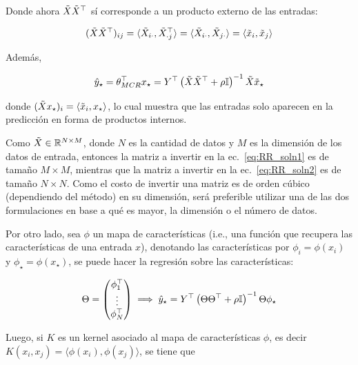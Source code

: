 Donde ahora $\tilde{X}\tilde{X}^\top$ sí corresponde a un producto externo de las entradas:

\begin{equation}
	(\tilde{X}\tilde{X}^\top)_{ij}=\langle\tilde{X}_{i\cdot},\tilde{X}^\top_{\cdot j}\rangle=\langle\tilde{X}_{i\cdot},\tilde{X}_{j\cdot}\rangle = \langle \tilde{x}_i,\tilde{x}_j\rangle
\end{equation}

Además,

\begin{equation}
	\hat{y}_\star = \theta_{MCR}^\top x_\star = Y^\top \left(\tilde{X}\tilde{X}^\top + \rho{\mathbb I}\right)^{-1}\tilde{X} \tilde{x}_\star
\end{equation}

donde $(\tilde{X} x_\star)_i = \langle \tilde{x}_i,x_\star\rangle$, lo cual muestra que las entradas solo aparecen en la predicción en forma de productos internos.

\begin{remark}
Como $\tilde{X}\in\mathbb{R}^{N\times M}$, donde $N$ es la cantidad de datos y $M$ es la dimensión de los datos de entrada, entonces la matriz a invertir en la ec.~\eqref{eq:RR_soln1} es de tamaño $M\times M$, mientras que la matriz a invertir en la ec.~\eqref{eq:RR_soln2} es de tamaño $N\times N$. Como el costo de invertir una matriz es de orden cúbico (dependiendo del método) en su dimensión, será preferible utilizar una de las dos formulaciones en base a qué es mayor, la dimensión o el número de datos. 
\end{remark}

Por otro lado, sea $\phi$ un mapa de características (i.e., una función que recupera las características de una entrada $x$), denotando las características por $\phi_i=\phi(x_i)$ y $\phi_\star = \phi(x_\star)$, se puede hacer la regresión sobre las características:

\begin{equation}
	\Theta=\left(\begin{matrix}
		\phi_1^\top\\
		\vdots\\
		\phi_N^\top
	\end{matrix}\right) \implies \hat{y}_\star = Y^\top \left(\Theta\Theta^\top + \rho{\mathbb I}\right)^{-1}\Theta \phi_\star
\end{equation}

Luego, si $K$ es un kernel asociado al mapa de características $\phi$, es decir $K(x_i,x_j)=\langle\phi(x_i),\phi(x_j)\rangle$, se tiene que


